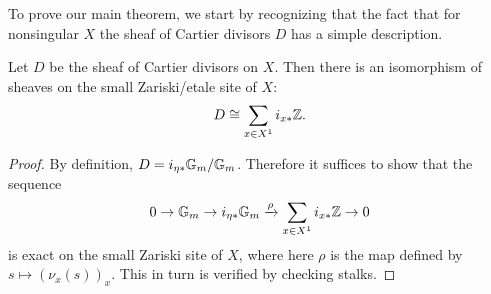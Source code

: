 To prove our main theorem, we start by recognizing that the fact that for nonsingular $X$ the sheaf of Cartier divisors $D$ has a simple description.
\begin{lem}
Let $D$ be the sheaf of Cartier divisors on $X$.  Then there is an isomorphism of sheaves on the small Zariski/etale site of $X$:
$$D\cong \sum_{x\in X^1}i_{x*}\mathbb{Z}.$$
\end{lem}
\begin{proof}
By definition, $D = i_{\eta*}\mathbb{G}_m/\mathbb{G}_m$.  Therefore it suffices to show that the sequence
$$0\rightarrow\mathbb{G}_m\rightarrow i_{\eta*}\mathbb{G}_m \xrightarrow{\rho} \sum_{x\in X^1}i_{x*}\mathbb{Z}\rightarrow 0$$
is exact on the small Zariski site of $X$, where here $\rho$ is the map defined by $s\mapsto (\nu_x(s))_x$.  This in turn is verified by checking stalks.
\end{proof}

